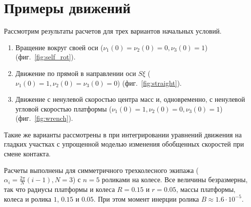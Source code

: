 
\section{Примеры движений}

Рассмотрим результаты расчетов для трех вариантов начальных условий.
\begin{enumerate}[wide]
    \item \label{sol:self_rot} Вращение вокруг своей оси ($\nu_1(0) = \nu_2(0) = 0, \nu_3(0) = 1$) (фиг.~\ref{fig:self_rot}).
    \item \label{sol:straight} Движение по прямой в направлении оси $S\xi$ ($\nu_1(0) = 1, \nu_2(0) = \nu_3(0) = 0$) (фиг.~\ref{fig:straight}).
    \item \label{sol:wrench} Движение с ненулевой скоростью центра масс и, одновременно, с ненулевой угловой скоростью платформы ($\nu_1(0) = 1, \nu_2(0) = 0, \nu_3(0) = 1$) (фиг.~\ref{fig:wrench}).
\end{enumerate}
Такие же варианты рассмотрены в \cite{ZobovaGerasimovPMM} при интегрировании уравнений движения на гладких участках с упрощенной моделью изменения обобщенных скоростей при смене контакта.

Расчеты выполнены для симметричного трехколесного экипажа ($\alpha_i = \frac{2\pi}{N}(i - 1), N = 3$) с $n = 5$ роликами на колесе. Все величины безразмерны, так что радиусы платформы и колеса $R = 0.15$ и $r = 0.05$, массы платформы, колеса и ролика $1$, $0.15$ и $0.05$. При этом момент инерции ролика $B \approx 1.6 \cdot 10^{-5}$.


